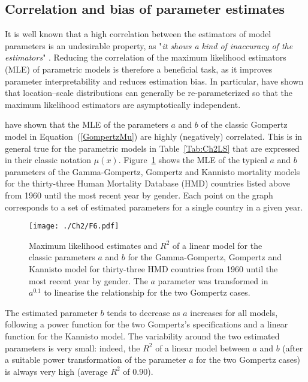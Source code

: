 \documentclass[Thesis]{subfiles}
\begin{document}
\subsection{Correlation and bias of parameter estimates}
\label{Subsec:Ch2subsec3.2}

It is well known that a high correlation between the estimators of model parameters is an undesirable property, as "\textit{it shows a kind of inaccuracy of the estimators}" \cite[][p.~588]{gupta1994location}. Reducing the correlation of the maximum likelihood estimators (MLE) of parametric models is therefore a beneficial task, as it improves parameter interpretability and reduces estimation bias. In particular, \cite{gupta1994location} have shown that  location--scale distributions can generally be re-parameterized so that the maximum likelihood estimators are asymptotically independent.

\cite{missov2015gompertz} have shown that the MLE of the parameters $a$ and $b$ of the classic Gompertz model in Equation~(\ref{GompertzMu}) are highly (negatively) correlated. This is in general true for the parametric models in Table~\ref{Tab:Ch2LS} that are expressed in their classic notation $\mu(x)$. Figure~\ref{Fig:Ch2CorrNOR} shows the MLE of the typical $a$ and $b$ parameters of the Gamma-Gompertz, Gompertz and Kannisto mortality models for the thirty-three Human Mortality Database (HMD) countries listed above from 1960 until the most recent year by gender. Each point on the graph corresponds to a set of estimated parameters for a single country in a given year. 

\begin{figure}[!ht]
	\centering
	\texttt{[image: ./Ch2/F6.pdf]}
	\caption{Maximum likelihood estimates and $R^2$ of a linear model for the classic parameters $a$ and $b$ for the Gamma-Gompertz, Gompertz and Kannisto model for thirty-three HMD countries from 1960 until the most recent year by gender. The $a$ parameter was transformed in $a^{0.1}$ to linearise the relationship for the two Gompertz cases.}\label{Fig:Ch2CorrNOR}
	
\end{figure}

The estimated parameter $b$ tends to decrease as $a$ increases for all models, following a power function for the two Gompertz's specifications and a linear function for the Kannisto model. The variability around the two estimated parameters is very small: indeed, the $R^2$ of a linear model between $a$ and $b$ (after a suitable power transformation of the parameter $a$ for the two Gompertz cases) is always very high (average $R^2$ of 0.90). 
\end{document}
